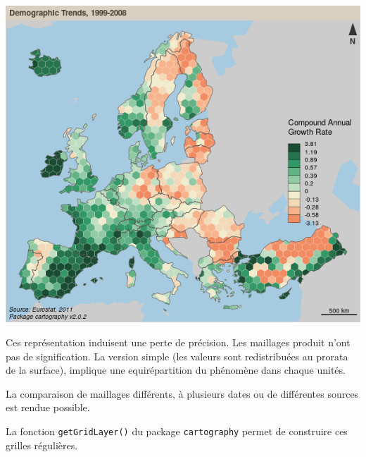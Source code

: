 \documentclass[]{book}
\let\BeginKnitrBlock\begin \let\EndKnitrBlock\end
\begin{document}
\begin{center}\includegraphics[width=8.33in]{img/grid} \end{center}

\BeginKnitrBlock{rmdmoins}
Ces représentation induisent une perte de précision. Les maillages
produit n'ont pas de signification. La version simple (les valeurs sont
redistribuées au prorata de la surface), implique une equirépartition du
phénomène dans chaque unités.
\EndKnitrBlock{rmdmoins}

\BeginKnitrBlock{rmdplus}
La comparaison de maillages différents, à plusieurs dates ou de
différentes sources est rendue possible.
\EndKnitrBlock{rmdplus}

La fonction \texttt{getGridLayer()} du package \texttt{cartography}
permet de construire ces grilles régulières.
\end{document}
